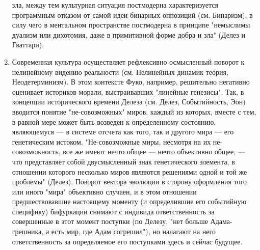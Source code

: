 \documentclass[12pt]{article}
\begin{document}
\begin{enumerate}
зла,  между  тем  культурная  ситуация  постмодерна  характеризуется  программным  отказом  от  самой  идеи
бинарных  оппозиций  (см.  Бинаризм),  в  силу  чего  в  ментальном  пространстве  постмодерна  в  принципе
"немыслимы  дуализм  или  дихотомия,  даже  в  примитивной  форме  добра  и  зла"  (Делез  и  Гваттари).
\item Современная культура осуществляет рефлексивно осмысленный поворот к нелинейному видению реальности
(см. Нелинейных динамик теория, Неодетерминизм). В этом контексте Фуко, например, решительно негативно
оценивает историков морали, выстраивавших "линейные генезисы". Так, в концепции исторического времени
Делеза (см. Делез, Событийность, Эон) вводится понятие "не-совозможных" миров, каждый из которых, вместе
с тем, в равной мере может быть возведен к определенному состоянию, являющемуся — в системе отсчета как
того,  так  и  другого  мира  —  его  генетическим  истоком.  "Не-совозможные  миры,  несмотря  на  их  не-совозможность,  все  же  имеют  нечто  общее  —  нечто  объективно  общее,  —  что  представляет  собой
двусмысленный знак генетического элемента, в отношении которого несколько миров являются решениями
одной и той же проблемы" (Делез). Поворот вектора эволюции в сторону оформления того или иного "мира"
объективно  случаен,  и  в  этом  отношении  предшествовавшие  настоящему  моменту  (и  определившие  его
событийную специфику) бифуркации снимают с индивида ответственность за совершенные в этот момент
поступки (по Делезу, "нет больше Адама-грешника, а есть мир, где Адам согрешил"), но налагают на него
ответственность  за  определяемое  его  поступками  здесь  и  сейчас  будущее. 
\end{enumerate}
\end{document}
